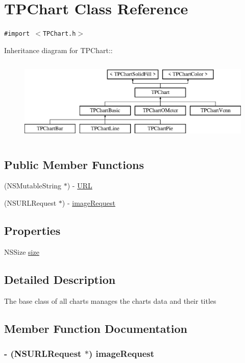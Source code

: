 \hypertarget{interface_t_p_chart}{
\section{TPChart Class Reference}
\label{interface_t_p_chart}
}
{\tt \#import $<$TPChart.h$>$}

Inheritance diagram for TPChart::\begin{figure}[H]
\begin{center}
\leavevmode
\includegraphics[height=4cm]{interface_t_p_chart}
\end{center}
\end{figure}
\subsection*{Public Member Functions}
\begin{CompactItemize}
\item 
(NSMutableString $\ast$) - \hyperlink{interface_t_p_chart_0de05415b5d6de4d791a119a51468bf8}{URL}
\item 
(NSURLRequest $\ast$) - \hyperlink{interface_t_p_chart_34d673557c84b693e02cd5fe587b9c6f}{imageRequest}
\end{CompactItemize}
\subsection*{Properties}
\begin{CompactItemize}
\item 
NSSize \hyperlink{interface_t_p_chart_050f86ea651d6dee6d96cec69ff3a617}{size}
\end{CompactItemize}


\subsection{Detailed Description}
The base class of all charts manages the charts data and their titles 

\subsection{Member Function Documentation}
\hypertarget{interface_t_p_chart_34d673557c84b693e02cd5fe587b9c6f}{
\subsubsection[{imageRequest}]{\setlength{\rightskip}{0pt plus 5cm}- (NSURLRequest $\ast$) imageRequest }}
\label{interface_t_p_chart_34d673557c84b693e02cd5fe587b9c6f}


